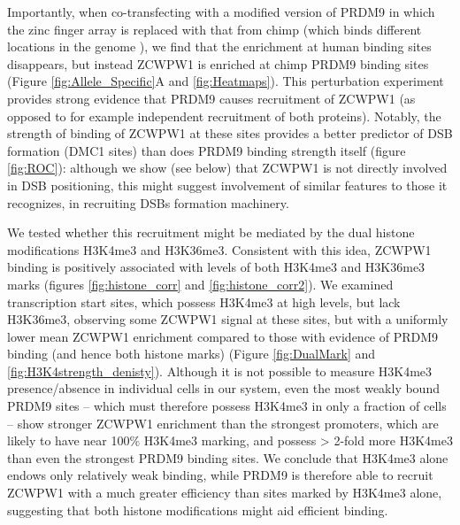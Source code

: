 Importantly, when co-transfecting with a modified version of PRDM9 in which the zinc finger array is replaced with that from chimp (which binds different locations in the genome \parencite{Altemose2017map}), we find that the enrichment at human binding sites disappears, but instead ZCWPW1 is enriched at chimp PRDM9 binding sites (Figure \ref{fig:Allele_Specific}A and \ref{fig:Heatmaps}).
This perturbation experiment provides strong evidence that PRDM9 causes recruitment of ZCWPW1 (as opposed to for example independent recruitment of both proteins).
Notably, the strength of binding of ZCWPW1 at these sites provides a better predictor of DSB formation (DMC1 sites) than does PRDM9 binding strength itself (figure \ref{fig:ROC}): although we show (see below) that ZCWPW1 is not directly involved in DSB positioning, this might suggest involvement of similar features to those it recognizes, in recruiting DSBs formation machinery.

We tested whether this recruitment might be mediated by the dual histone modifications H3K4me3 and H3K36me3.
Consistent with this idea, ZCWPW1 binding is positively associated with levels of both H3K4me3 and H3K36me3 marks (figures \ref{fig:histone_corr} and \ref{fig:histone_corr2}).
We examined transcription start sites, which possess H3K4me3 at high levels, but lack H3K36me3, observing some ZCWPW1 signal at these sites, but with a uniformly lower mean ZCWPW1 enrichment compared to those with evidence of PRDM9 binding (and hence both histone marks) (Figure \ref{fig:DualMark} and \ref{fig:H3K4strength_denisty}).
Although it is not possible to measure H3K4me3 presence/absence in individual cells in our system, even the most weakly bound PRDM9 sites – which must therefore possess H3K4me3 in only a fraction of cells – show stronger ZCWPW1 enrichment than the strongest promoters, which are likely to have near 100\% H3K4me3 marking, and possess > 2-fold more H3K4me3 than even the strongest PRDM9 binding sites.
We conclude that H3K4me3 alone endows only relatively weak binding, while PRDM9 is therefore able to recruit ZCWPW1 with a much greater efficiency than sites marked by H3K4me3 alone, suggesting that both histone modifications might aid efficient binding.


